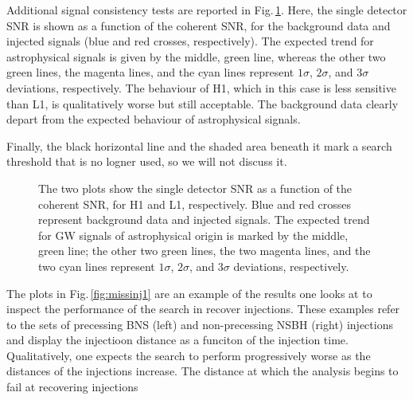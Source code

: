 \documentclass[binding=0.6cm, LaM]{sapthesis}
\begin{document}
	Additional signal consistency tests are reported in Fig.\,\ref{fig:detector1}. 
	Here, the single detector SNR is shown as a function of the coherent SNR, 
	for the background data and injected signals (blue and red crosses, respectively).
	The expected trend for astrophysical signals is given by the middle, green line, 
	whereas the other two green lines, the magenta lines, and the cyan lines represent $1\sigma$, $2\sigma$, 
	and $3\sigma$ deviations, respectively.
	The behaviour of H1, which in this case is less sensitive than L1, 
	is qualitatively worse but still acceptable.  
	The background data clearly depart from the expected behaviour of astrophysical signals.
        
	Finally, the black horizontal line and the shaded area beneath it mark a search threshold 
	that is no logner used, so we will not discuss it.
        \begin{figure}[!t]
          \noindent
          \label{detector1}
          \centering
          \caption{The two plots show the single detector SNR as a function of the coherent SNR, for H1 and L1, respectively.  Blue and red crosses represent background data and injected signals.  The expected trend for GW signals of astrophysical origin is marked by the middle, green line; the other two green lines, the two magenta lines, and the two cyan lines represent $1\sigma$, $2\sigma$, and $3\sigma$ deviations, respectively.}
          \label{fig:detector1}
        \end{figure}
	The plots in Fig.\,\ref{fig:missinj1} are an example of the results 
	one looks at to inspect the performance of the search in recover injections.
        These examples refer to the sets of precessing BNS (left) and non-precessing NSBH (right) 
	injections and display the injectioon distance as a funciton of the injection time.  
	Qualitatively, one expects the search to perform progressively worse 
	as the distances of the injections increase. 
	The distance at which the analysis begins to fail at recovering injections 
\end{document}
